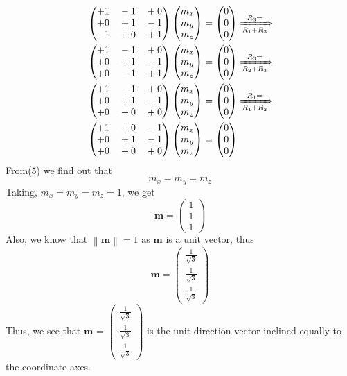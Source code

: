 \documentclass{article}
\newcommand{\myvec}[1]{\ensuremath{\begin{pmatrix}#1\end{pmatrix}}}
\newcommand{\norm}[1]{\left\lVert#1\right\rVert}
\let\vec\mathbf
\begin{document}
\begin{align}
& \myvec{+1 \quad  -1 \quad +0 \\ +0 \quad +1 \quad -1 \\ -1 \quad +0 \quad +1 }\myvec{m_x \\ m_y \\ m_z} = \myvec{0 \\ 0 \\ 0}  \xRightarrow[R_1+R_3]{R_3=} \\
& \myvec{+1 \quad  -1 \quad +0 \\ +0 \quad +1 \quad -1 \\ +0 \quad -1 \quad +1 }\myvec{m_x \\ m_y \\ m_z} = \myvec{0 \\ 0 \\ 0} 
\xRightarrow[R_2+R_3]{R_3=} \\
& \myvec{+1 \quad  -1 \quad +0 \\ +0 \quad +1 \quad -1 \\ +0 \quad +0 \quad +0 }\myvec{m_x \\ m_y \\ m_z} = \myvec{0 \\ 0 \\ 0} 
\xRightarrow[R_1+R_2]{R_1=} \\
& \myvec{+1 \quad  +0 \quad -1 \\ +0 \quad +1 \quad -1 \\ +0 \quad +0 \quad +0 }\myvec{m_x \\ m_y \\ m_z} = \myvec{0 \\ 0 \\ 0}
\end{align}
From($5$) we find out that
\begin{equation*}
m_x = m_y = m_z
\end{equation*}
Taking, $m_x = m_y = m_z =1$, we get
\begin{equation*}
\vec{m} = \myvec{1 \\ 1 \\1}
\end{equation*}
Also, we know that $\norm{\vec{m}}=1$ as $\vec{m}$ is a unit vector, thus
\begin{equation*}
\vec{m} = \myvec{\frac{1}{\sqrt{3}} \\ \frac{1}{\sqrt{3}} \\ \frac{1}{\sqrt{3}}}
\end{equation*}
Thus, we see that  $\vec{m}$ = $\myvec{ \frac{1}{\sqrt{3}} \\ \frac{1}{\sqrt{3}} \\ \frac{1}{\sqrt{3}}}$ is the unit direction vector inclined equally to the coordinate axes.\\
\end{document}
